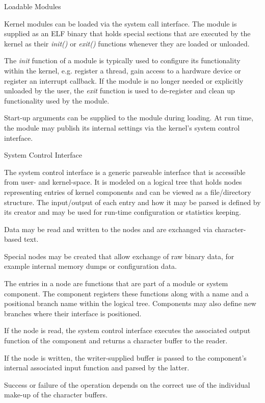 %
{Loadable Modules}{%
Kernel modules can be loaded via the system call interface. The module is
supplied as an \gls{ELF} binary that holds special sections that are executed
by the kernel as their \emph{init()} or \emph{exit()} functions whenever
they are loaded or unloaded. \newline

The \emph{init} function of a module is typically
used to configure its functionality within the kernel, e.g. register a
thread, gain access to a hardware device or register an interrupt callback.
If the module is no longer needed or explicitly unloaded by the user, the
\emph{exit} function is used to de-register and clean up functionality
used by the module. \newline

Start-up arguments can be supplied to the module during loading. At run time,
the module may publish its internal settings via the kernel's system control
interface.
}%
{}{}


%
{System Control Interface}{%
The system control interface is a generic parseable interface that is accessible
from user- and kernel-space. It is modeled on a logical tree that holds nodes
representing entries of kernel components and can be viewed as a file/directory
structure. The input/output of each entry and how it may be parsed is defined
by its creator and may be used for run-time configuration or statistics keeping.
\newline

Data may be read and written to the nodes and are exchanged via
character-based text.\newline

Special nodes may be created that allow exchange of raw binary data, for example
internal memory dumps or configuration data.\newline

The entries in a node are functions that are part of a module or system
component. The component registers these functions along with a name and a
positional branch name within the logical tree. Components may also define new
branches where their interface is positioned.\newline

If the node is read, the system control interface executes the associated
output function of the component and returns a character buffer to the reader.
\newline

If the node is written, the writer-supplied buffer is passed to the component's
internal associated input function and parsed by the latter. \newline

Success or failure of the operation depends on the correct use of the individual
make-up of the character buffers.
}%
{}{}



